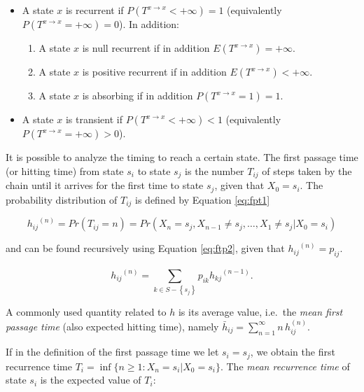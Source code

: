 \documentclass[
  nojss]{jss}
\providecommand{\tightlist}{%
  \setlength{\itemsep}{0pt}\setlength{\parskip}{0pt}}
\begin{document}
\begin{itemize}
\tightlist
\item
  A state \(x\) is recurrent if \(P(T^{x\rightarrow x}<+\infty)=1\) (equivalently \(P(T^{x\rightarrow x}=+\infty)=0\)). In addition:

  \begin{enumerate}
  \def\labelenumi{\arabic{enumi}.}
  \tightlist
  \item
    A state \(x\) is null recurrent if in addition \(E(T^{x\rightarrow x})=+\infty\).
  \item
    A state \(x\) is positive recurrent if in addition \(E(T^{x\rightarrow x})<+\infty\).
  \item
    A state \(x\) is absorbing if in addition \(P(T^{x\rightarrow x}=1)=1\).
  \end{enumerate}
\item
  A state \(x\) is transient if \(P(T^{x\rightarrow x}<+\infty)<1\) (equivalently \(P(T^{x\rightarrow x}=+\infty)>0\)).
\end{itemize}

It is possible to analyze the timing to reach a certain state. The first passage time (or hitting time) from state \(s_{i}\) to state \(s_{j}\) is the number \(T_{ij}\) of steps taken by the chain until it arrives for the first time to state \(s_{j}\), given that \(X_{0} = s_{i}\). The probability distribution of \(T_{ij}\) is defined by Equation \ref{eq:fpt1}

\begin{equation}
{h_{ij}}^{\left( n \right)} = Pr\left( {T_{ij} = n} \right) = Pr\left( X_n = s_j,X_{n - 1} \ne s_{j}, \ldots ,X_1 \ne s_j |X_0 = s_i \right)
\label{eq:fpt1}
\end{equation}

and can be found recursively using Equation \ref{eq:ftp2}, given that \({h_{ij}}^{\left( n \right)} = p_{ij}\).

\begin{equation}
{h_{ij}}^{\left( n \right)} = \sum\limits_{k \in S - \left\{ s_{j} \right\}}^{} {{p_{ik}}{h_{kj}}^{\left( {n - 1} \right)}}.
\label{eq:ftp2}
\end{equation}

A commonly used quantity related to \(h\) is its average value, i.e.~the \emph{mean first passage time} (also expected hitting time), namely \(\bar h_{ij}= \sum_{n=1}^{\infty} n \,h_{ij}^{(n)}\).

If in the definition of the first passage time we let \(s_{i}=s_{j}\), we obtain the first recurrence time \(T_{i}=\inf \{ n\geq1:X_{n}=s_{i}|X_{0}=s_{i} \}\). The \emph{mean recurrence time} of state \(s_{i}\) is the expected value of \(T_{i}\):
\end{document}
